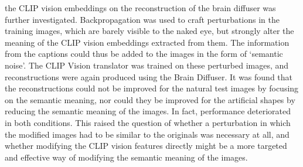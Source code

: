 the CLIP vision embeddings on the reconstruction of the brain diffuser was further investigated. Backpropagation was used to craft perturbations in the training images, which are barely visible to the naked eye, but strongly alter the meaning of the CLIP vision embeddings extracted from them. The information from the captions could thus be added to the images in the form of `semantic noise'. The CLIP Vision translator was trained on these perturbed images, and reconstructions were again produced using the Brain Diffuser. It was found that the reconstructions could not be improved for the natural test images by focusing on the semantic meaning, nor could they be improved for the artificial shapes by reducing the semantic meaning of the images. In fact, performance deteriorated in both conditions. This raised the question of whether a perturbation in which the modified images had to be similar to the originals was necessary at all, and whether modifying the CLIP vision features directly might be a more targeted and effective way of modifying the semantic meaning of the images.

